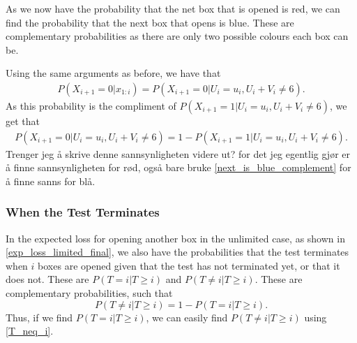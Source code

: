 As we now have the probability that the net box that is opened is red, we can find the probability that the next box that opens is blue. These are complementary probabilities as there are only two possible colours each box can be. 

Using the same arguments as before, we have that
\begin{equation}
    \begin{aligned}
        P(X_{i+1}=0|x_{1:i}) = P(X_{i+1}=0|U_i=u_i,U_i+V_i\neq6).
    \end{aligned}
\end{equation}
As this probability is the compliment of $P(X_{i+1}=1|U_i=u_i,U_i+V_i\neq6)$, we get that
\begin{equation}
\label{next_is_blue_complement}
    \begin{aligned}
        P(X_{i+1}=0|U_i=u_i,U_i+V_i\neq6) = 1 - P(X_{i+1}=1|U_i=u_i,U_i+V_i\neq6).
    \end{aligned}
\end{equation}
Trenger jeg å skrive denne sannsynligheten videre ut? for det jeg egentlig gjør er å finne sannsynligheten for rød, også bare bruke \eqref{next_is_blue_complement} for å finne sanns for blå.


\subsubsection{When the Test Terminates}
In the expected loss for opening another box in the unlimited case, as shown in \eqref{exp_loss_limited_final}, we also have the probabilities that the test terminates when $i$ boxes are opened given that the test has not terminated yet, or that it does not. These are $P(T=i|T\geq i)$ and $P(T\neq i|T\geq i)$. These are complementary probabilities, such that
\begin{equation}
\label{T_neq_i}
    P(T \neq i|T\geq i) = 1-P(T=i|T\geq i).
\end{equation}
Thus, if we find $P(T=i|T\geq i)$, we can easily find $P(T\neq i|T\geq i)$ using \eqref{T_neq_i}. 

